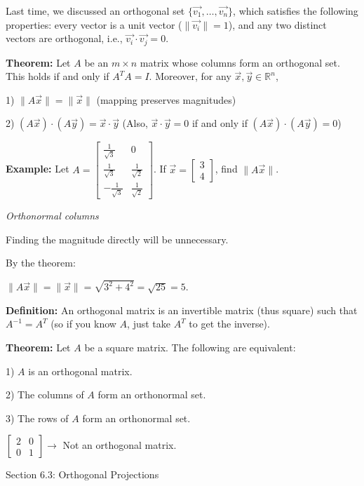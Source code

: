 \documentclass{article}
\begin{document}
Last time, we discussed an orthogonal set $\{\vec{v_1}, \ldots, \vec{v_n}\}$, which satisfies the following properties: every vector is a unit vector ($\|\vec{v_i}\| = 1$), and any two distinct vectors are orthogonal, i.e., $\vec{v_i} \cdot \vec{v_j} = 0$.

\textbf{Theorem:} Let $A$ be an $m \times n$ matrix whose columns form an orthogonal set. This holds if and only if $A^TA = I$. Moreover, for any $\vec{x}, \vec{y} \in \mathbb{R}^n$,

1) $\|A\vec{x}\| = \|\vec{x}\|$ (mapping preserves magnitudes)

2) $(A\vec{x}) \cdot (A\vec{y}) = \vec{x} \cdot \vec{y}$ (Also, $\vec{x} \cdot \vec{y} = 0$ if and only if $(A\vec{x}) \cdot (A\vec{y}) = 0$)

\textbf{Example:} Let $A = \left[\begin{array}{cc} \frac{1}{\sqrt{3}} & 0 \\ \frac{1}{\sqrt{3}} & \frac{1}{\sqrt{2}} \\ -\frac{1}{\sqrt{3}} & \frac{1}{\sqrt{2}} \end{array}\right]$. If $\vec{x} = \left[\begin{array}{c} 3 \\ 4 \end{array}\right]$, find $\|A\vec{x}\|$.

\textit{Orthonormal columns}

Finding the magnitude directly will be unnecessary.

By the theorem: 

$\|A\vec{x}\| = \|\vec{x}\| = \sqrt{3^2+4^2} = \sqrt{25} = 5$.

\textbf{Definition:} An orthogonal matrix is an invertible matrix (thus square) such that $A^{-1} = A^T$ (so if you know $A$, just take $A^T$ to get the inverse).

\textbf{Theorem:} Let $A$ be a square matrix. The following are equivalent:

1) $A$ is an orthogonal matrix.

2) The columns of $A$ form an orthonormal set.

3) The rows of $A$ form an orthonormal set.

$\left[\begin{array}{cc} 2 & 0 \\ 0 & 1 \end{array}\right] \rightarrow$ Not an orthogonal matrix.


Section 6.3: Orthogonal Projections
\end{document}

